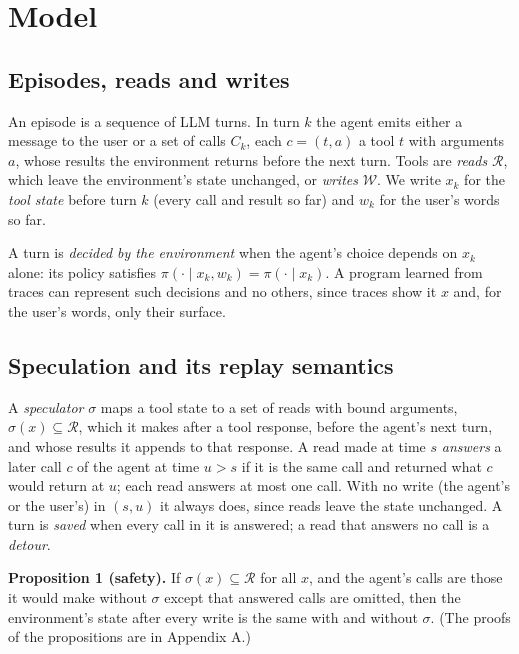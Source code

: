 \documentclass[10pt,twocolumn,letterpaper]{article}
\newcommand{\runin}[1]{{\sffamily\bfseries\color{accent}#1}}
\begin{document}
\section{Model}\label{model}

\subsection{Episodes, reads and writes}\label{episodes-reads-and-writes}

An episode is a sequence of LLM turns. In turn \(k\) the agent emits either a message to the user or a set of calls \(C_k\), each \(c = (t, a)\) a tool \(t\) with arguments \(a\), whose results the environment returns before the next turn. Tools are \emph{reads} \(\mathcal R\), which leave the environment's state unchanged, or \emph{writes} \(\mathcal W\). We write \(x_k\) for the \emph{tool state} before turn \(k\) (every call and result so far) and \(w_k\) for the user's words so far.

A turn is \emph{decided by the environment} when the agent's choice depends on \(x_k\) alone: its policy satisfies \(\pi(\cdot \mid x_k, w_k) = \pi(\cdot \mid x_k)\). A program learned from traces can represent such decisions and no others, since traces show it \(x\) and, for the user's words, only their surface.

\subsection{Speculation and its replay semantics}\label{speculation-and-its-replay-semantics}

A \emph{speculator} \(\sigma\) maps a tool state to a set of reads with bound arguments, \(\sigma(x) \subseteq \mathcal R\), which it makes after a tool response, before the agent's next turn, and whose results it appends to that response. A read made at time \(s\) \emph{answers} a later call \(c\) of the agent at time \(u > s\) if it is the same call and returned what \(c\) would return at \(u\); each read answers at most one call. With no write (the agent's or the user's) in \((s, u)\) it always does, since reads leave the state unchanged. A turn is \emph{saved} when every call in it is answered; a read that answers no call is a \emph{detour}.

\begin{prop}
\runin{Proposition 1 (safety).} If \(\sigma(x) \subseteq \mathcal R\) for all \(x\), and the agent's calls are those it would make without \(\sigma\) except that answered calls are omitted, then the environment's state after every write is the same with and without \(\sigma\). (The proofs of the propositions are in Appendix A.)
\end{prop}
\end{document}
